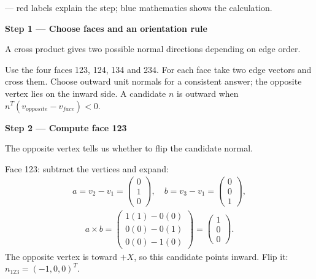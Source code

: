\documentclass[letterpaper,11pt,english,openany,oneside]{jupyterBook}
\begin{document}
\par\medskip

\sphinxAtStartPar
{} — red labels explain the step; blue mathematics shows the calculation.

\par\medskip{}
{\color{QuizStepRed}\bfseries Step 1 — Choose faces and an orientation rule}\par\smallskip

\sphinxAtStartPar
{} A cross product gives two possible normal directions depending on edge order.

\sphinxAtStartPar
Use the four faces 123, 124, 134 and 234. For each face take two edge vectors and cross them. Choose outward unit normals for a consistent answer; the opposite vertex lies on the inward side. A candidate {\color{QuizMathBlue} \(n\)} is outward when {\color{QuizMathBlue} \(n^T(v_{opposite}-v_{face})<0\)}.

\par

\par\medskip{}
{\color{QuizStepRed}\bfseries Step 2 — Compute face 123}\par\smallskip

\sphinxAtStartPar
{} The opposite vertex tells us whether to flip the candidate normal.

\sphinxAtStartPar
Face 123: subtract the vertices and expand:
{\color{QuizMathBlue} \begin{equation*}
\begin{split}
a=v_2-v_1=\begin{pmatrix}0\\1\\0\end{pmatrix},\quad b=v_3-v_1=\begin{pmatrix}0\\0\\1\end{pmatrix},
\end{split}
\end{equation*}}{\color{QuizMathBlue} \begin{equation*}
\begin{split}
a\times b=\begin{pmatrix}1(1)-0(0)\\0(0)-0(1)\\0(0)-1(0)\end{pmatrix}
=\begin{pmatrix}1\\0\\0\end{pmatrix}.
\end{split}
\end{equation*}}
\sphinxAtStartPar
The opposite vertex is toward {\color{QuizMathBlue} \(+X\)}, so this candidate points inward. Flip it: {\color{QuizMathBlue} \(n_{123}=(-1,0,0)^T\)}.
\end{document}
